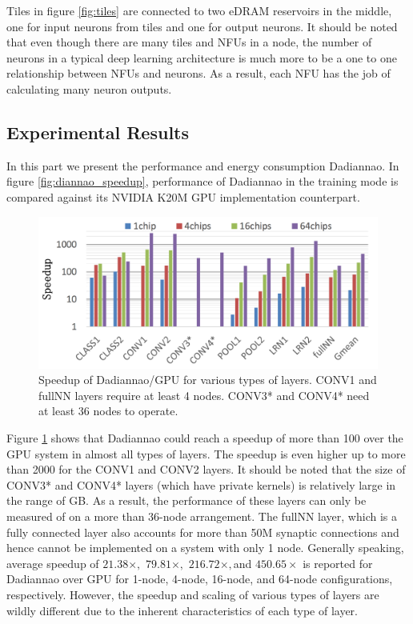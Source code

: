 \documentclass[runningheads,a4paper]{llncs}
\begin{document}
{Tiles in figure \ref{fig:tiles} are connected to two eDRAM reservoirs in the middle, one for input neurons from tiles and one for output neurons. It should be noted that even though there are many tiles and NFUs in a node, the number of neurons in a typical deep learning architecture is much more to be a one to one relationship between NFUs and neurons. As a result, each NFU has the job of calculating many neuron outputs. 

\subsection*{Experimental Results}
In this part we present the performance and energy consumption Dadiannao. In figure \ref{fig:diannao_speedup}, performance of Dadiannao in the training mode is compared against its NVIDIA K20M GPU implementation counterpart.
\begin{figure}[h]
	\includegraphics[scale=0.45]{./images/dadiannao_speedup.png}
	\centering
	\caption{Speedup of Dadiannao/GPU for various types of layers. CONV1 and fullNN layers require at least 4 nodes. CONV3* and CONV4* need at least 36 nodes to operate\cite{chen2014dadiannao}.}
	\label{fig:dadiannao_speedup}
\end{figure}

Figure \ref{fig:dadiannao_speedup} shows that Dadiannao could reach a speedup of more than 100 over the GPU system in almost all types of layers. The speedup is even higher up to more than 2000 for the CONV1 and CONV2 layers. It should be noted that the size of CONV3* and CONV4* layers (which have private kernels) is relatively large in the range of GB. As a result, the performance of these layers can only be measured of on a more than 36-node arrangement. The fullNN layer, which is a fully connected layer also accounts for more than 50M synaptic connections and hence cannot be implemented on a system with only 1 node. Generally speaking, average speedup of $21.38\times,$ $79.81\times,$ $216.72\times,$and $450.65\times$ is reported for Dadiannao over GPU for 1-node, 4-node, 16-node, and 64-node configurations, respectively. However, the speedup and scaling of various types of layers are wildly different due to the inherent characteristics of each type of layer.\\

}
\end{document}
